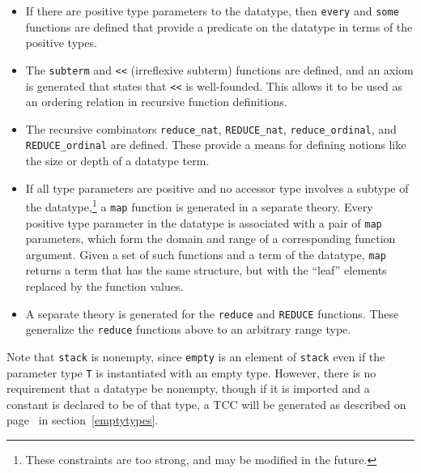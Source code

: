 \begin{itemize}
\item If there are positive type parameters to the datatype, then
\texttt{every} and \texttt{some} functions are defined that provide a
predicate on the datatype in terms of the positive types.

\item The \texttt{subterm} and \texttt{<<} (irreflexive subterm) functions
are defined, and an axiom is generated that states that \texttt{<<} is
well-founded.  This allows it to be used as an ordering relation in
recursive function definitions.

\item The recursive combinators \texttt{reduce\_nat},
\texttt{REDUCE\_nat}, \texttt{reduce\_ordinal}, and
\texttt{REDUCE\_ordinal} are defined.  These provide a means for defining
notions like the size or depth of a datatype term.

\item If all type parameters are positive and no accessor type involves a
subtype of the datatype,\footnote{These constraints are too strong, and
may be modified in the future.} a \texttt{map} function is generated in a
separate theory.  Every positive type parameter in the datatype is
associated with a pair of \texttt{map} parameters, which form the domain
and range of a corresponding function argument.  Given a set of such
functions and a term of the datatype, \texttt{map} returns a term that has
the same structure, but with the ``leaf'' elements replaced by the
function values.

\item A separate theory is generated for the \texttt{reduce} and
\texttt{REDUCE} functions.  These generalize the \texttt{reduce} functions
above to an arbitrary range type.

\end{itemize}

Note that \texttt{stack} is nonempty, since \texttt{empty} is an element
of \texttt{stack} even if the parameter type \texttt{T} is instantiated
with an empty type.  However, there is no requirement that a datatype be
nonempty, though if it is imported and a constant is declared to be of
that type, a TCC will be generated as described on
page~\pageref{emptytypes} in section~\ref{emptytypes}.

